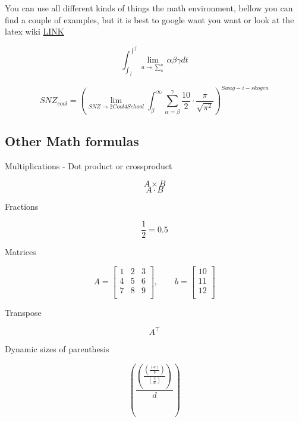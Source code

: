 You can use all different kinds of things the math environment, bellow you can find a couple of examples, but it is best to google want you want or look at the latex wiki \href{https://en.wikibooks.org/wiki/LaTeX/Advanced_Mathematics}{LINK}


$$
\int^{\int^\int}_{\int_\int} \lim_{a \to \sum^{a}_{a}} \alpha \beta \gamma dt
$$

\begin{equation}
    SNZ_{cool}
    = \left(
    \lim_{SNZ \to 2 Cool 4 School} \int_{\beta}^\infty \sum_{\alpha = \beta}^{\gamma} \frac{10}{2} \cdot \frac{\pi}{\sqrt{\pi^2}}
    \right)^{Swag-i-skogen}
\end{equation}

\subsection{Other Math formulas}

Multiplications - Dot product or crossproduct

\begin{equation}
    A \times B
\end{equation}
\begin{equation}
    A \cdot B
\end{equation}

Fractions

\begin{equation}
    \frac{1}{2}
    = 0.5
\end{equation}

Matrices

$$
A = 
\begin{bmatrix}
    1 & 2 & 3 \\
    4 & 5 & 6 \\
    7 & 8 & 9 \\
\end{bmatrix}
, \qquad
b = 
\begin{bmatrix}
    10 \\
    11 \\
    12 \\
\end{bmatrix}
$$

Transpose

\begin{equation}
    A^\top
\end{equation}

Dynamic sizes of parenthesis

\begin{equation}
    \left(
    \frac{
    \left(
    \frac{\left(\frac{\left( a \right)}{b} \right) }{\left(\frac{c}{d} \right) }
    \right)
    }{d}
    \right)
\end{equation} 

